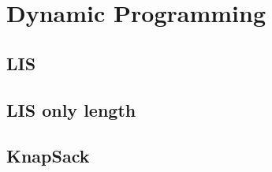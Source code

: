 \documentclass[10pt,landscape,a4paper,twocolumn]{article}
\begin{document}
\section {Dynamic Programming}

\subsection{LIS}


\subsection{LIS only length}


\subsection{KnapSack}

\end{document}
